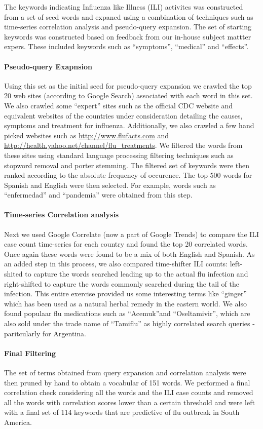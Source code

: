 
The keywords indicating Influenza like Illness (ILI) activites was
constructed from a set of seed words and expaned using a combination of 
techniques such as time-series correlation analysis and pseudo-query
expansion.
The set of starting keywords was constructed based on feedback from our 
in-house subject mattter expers. These included keywords such as 
``symptoms'', ``medical'' and ``effects''.
\paragraph{Pseudo-query Exapnsion}
Using this set as the initial seed for pseudo-query expansion we crawled
the top 20 web sites (according to Google Search) associated with each
word in this set. We also crawled some ``expert'' sites such as the official CDC
website and equivalent websites of the countries under consideration detailing the
causes, symptoms and treatment for influenza.
Additionally, we also crawled a few hand picked websites such as
\url{http://www.flufacts.com} and \url{http://health.yahoo.net/channel/flu\_treatments}.
We filtered the words from these sites using standard language
processing filtering techniques such as stopword removal and porter
stemming. The filtered set of keywords were then ranked according to 
the absolute frequency of occurence. The top 500 words for Spanish and
English were then selected. For example, words such as ``enfermedad'' 
and ``pandemia'' were obtained from this step.
\paragraph{Time-series Correlation analysis}
Next we used Google Correlate (now a part of Google Trends) to compare
the ILI case count time-series for each country and found the top 20
correlated words. Once again these words were found to be a mix of 
 both English and Spanish. As an added step in this process, we also
 compared time-shifter ILI counts: left-shited  to capture the words searched leading up to 
 the actual flu infection and right-shifted to capture the words
commonly searched during the tail of the infection. 
This entire exercise provided us some interesting terms like ``ginger'' which has been used as
a natural herbal remedy in the eastern world. We also found populaar flu medications
such as ``Acemuk''and  ``Oseltamivir'', which are also sold under the trade name of
``Tamiflu'' as highly correlated search queries - paritcularly for
Argentina.
\paragraph{Final Filtering}
The set of terms obtained from query expansion and correlation analysis were then 
pruned by hand to obtain a vocabular of 151 words. We performed a final
correlation check considering all the words and the ILI case counts and
removed all the words with correlation scores lower than a certain
threshold and were left with a final set of 114 keywords that are
predictive of flu outbreak in South America.
